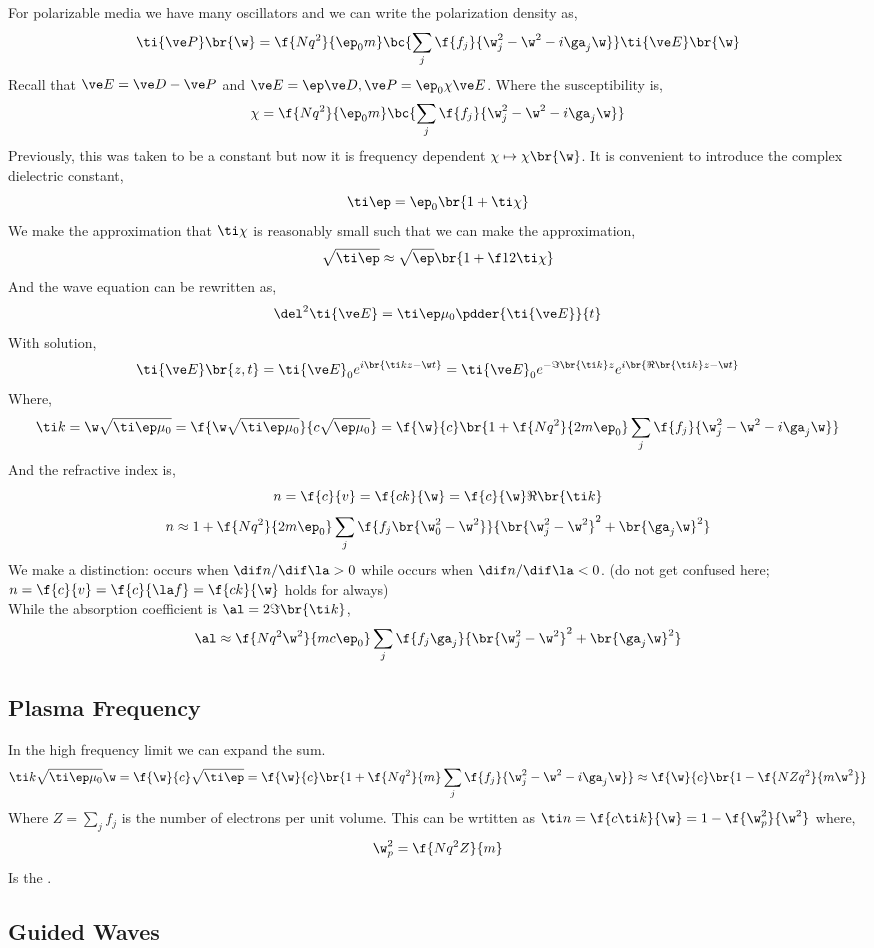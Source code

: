 \documentclass{article}
\begin{document}
For polarizable media we have many oscillators and we can write the polarization density as,
\[ \ti{\ve P}\br{\w} = \f{N q^2}{\ep_0 m} \bc{\sum_{j} \f{f_j}{\w_j^2 - \w^2 - i \ga_j \w}} \ti{\ve E}\br{\w} \]
Recall that $\ve E = \ve D - \ve P$ and $\ve E = \ep \ve D, \ve P = \ep_0 \chi \ve E$. Where the susceptibility is,
\[ \chi = \f{N q^2}{\ep_0 m} \bc{\sum_{j} \f{f_j}{\w_j^2 - \w^2 - i \ga_j \w}} \]
Previously, this was taken to be a constant but now it is frequency dependent $\chi \mapsto \chi\br{\w}$. It is convenient to introduce the complex dielectric constant,
\[ \ti \ep = \ep_0 \br{1 + \ti \chi} \]
We make the approximation that $\ti \chi$ is reasonably small such that we can make the approximation,
\[ \sqrt{\ti \ep} \approx \sqrt{\ep} \br{1 + \f12 \ti \chi} \]
And the wave equation can be rewritten as,
\[ \del^2 \ti{\ve E} = \ti \ep \mu_0 \pdder{\ti{\ve E}}{t} \]
With solution,
\[ \ti{\ve E}\br{z, t} = \ti{\ve E}_0 e^{i\br{\ti k z - \w t}} = \ti{\ve E}_0 e^{- \Im\br{\ti k} z} e^{i\br{\Re\br{\ti k} z - \w t}} \]
Where,
\[ \ti k = \w \sqrt{\ti \ep \mu_0} = \f{\w \sqrt{\ti \ep \mu_0}}{c \sqrt{\ep \mu_0}} = \f{\w}{c}\br{1 + \f{N q^2}{2 m \ep_0} \sum_j \f{f_j}{\w_j^2 - \w^2 - i \ga_j \w}} \]
And the refractive index is,
\[ n = \f{c}{v} = \f{ck}{\w} = \f{c}{\w} \Re\br{\ti k} \]
\[ n \approx 1 + \f{N q^2}{2 m \ep_0} \sum_j \f{f_j\br{\w_0^2 - \w^2}}{\br{\w_j^2 - \w^2}^2 + \br{\ga_j \w}^2} \]
We make a distinction:  occurs when $\dif n / \dif \la > 0$ while  occurs when $\dif n / \dif \la < 0$. (do not get confused here; $n = \f{c}{v} = \f{c}{\la f} = \f{c k}{\w}$ holds for always)\\
While the absorption coefficient is $\al = 2 \Im\br{\ti k}$,
\[ \al \approx \f{N q^2 \w^2 }{m c \ep_0} \sum_j \f{f_j \ga_j}{\br{\w_j^2 - \w^2}^2 + \br{\ga_j \w}^2} \]
\subsection{Plasma Frequency}
In the high frequency limit we can expand the sum.
\[ \ti k \sqrt{\ti \ep \mu_0} \w = \f{\w}{c} \sqrt{\ti \ep} = \f{\w}{c} \br{1 + \f{N q^2}{m} \sum_j \f{f_j}{\w_j^2 - \w^2 - i \ga_j \w}} \approx \f{\w}{c}\br{1 - \f{NZ q^2}{m \w^2}} \]
Where $Z = \sum_j f_j$ is the number of electrons per unit volume. This can be wrtitten as $\ti n = \f{c \ti k}{\w} = 1 - \f{\w_p^2}{\w^2}$ where,
\[ \w_p^2 = \f{Nq^2 Z}{m} \]
Is the .

\subsection{Guided Waves}
\end{document}
